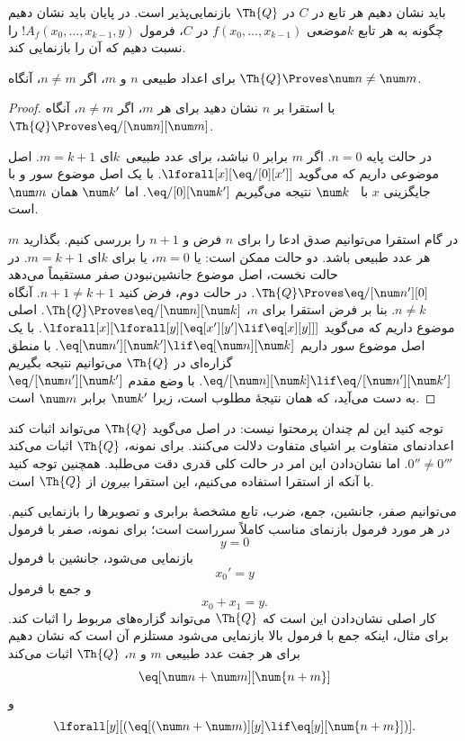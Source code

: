 \documentclass[../../../include/open-logic-section]{subfiles}
\begin{document}

باید نشان دهیم هر تابع در $C$ در $\Th{Q}$ بازنمایی‌پذیر است. در پایان
باید نشان دهیم چگونه به هر تابع $k$موضعی
$f(x_0,\dots,x_{k-1})$ در $C$، فرمول
$!A_f(x_0,\dots,x_{k-1},y)$ را نسبت دهیم که آن را بازنمایی کند.

\begin{lem}
برای اعداد طبیعی $n$ و $m$، اگر $n \neq m$، آنگاه
$\Th{Q} \Proves \num n \neq \num m$.
\end{lem}

\begin{proof}
با استقرا بر $n$ نشان دهید برای هر $m$، اگر $n \neq m$، آنگاه
$\Th{Q} \Proves \eq/[\num n][\num m]$.

در حالت پایه $n = 0$. اگر $m$ برابر $0$ نباشد، برای عدد طبیعی~$k$ای
$m = k + 1$. اصل موضوعی داریم که می‌گوید
$\lforall[x][\eq/[0][x']]$. با یک اصل موضوع سور و با جایگزینی $x$ با
~$\num k$ نتیجه می‌گیریم $\eq/[0][\num k']$. اما $\num k'$ همان
$\num m$ است.

در گام استقرا می‌توانیم صدق ادعا را برای $n$ فرض و $n+1$ را بررسی
کنیم. بگذارید $m$ هر عدد طبیعی باشد. دو حالت ممکن است: یا $m = 0$، یا
برای $k$ای $m = k+1$. در حالت نخست، اصل موضوع جانشین‌نبودن صفر مستقیماً
می‌دهد $\Th{Q} \Proves \eq/[\num n'][0]$. در حالت دوم، فرض کنید
$n+1 \neq k+1$. آنگاه $n \neq k$. بنا بر فرض استقرا برای $n$،
$\Th{Q} \Proves \eq/[\num n][\num k]$. اصلی موضوع داریم که می‌گوید
$\lforall[x][\lforall[y][\eq[x'][y'] \lif \eq[x][y]]]$. با یک اصل موضوع
سور داریم
$\eq[\num n'][\num k'] \lif \eq[\num n][\num k]$. با منطق گزاره‌ای در
$\Th{Q}$ می‌توانیم نتیجه بگیریم
$\eq/[\num n][\num k] \lif \eq/[\num n'][\num k']$. با وضع مقدم
$\eq/[\num n'][\num k']$ به دست می‌آید، که همان نتیجهٔ مطلوب است، زیرا
$\num k'$ برابر $\num m$ است.
\end{proof}

توجه کنید این لم چندان پرمحتوا نیست: در اصل می‌گوید $\Th{Q}$ می‌تواند
اثبات کند اعدادنمای متفاوت بر اشیای متفاوت دلالت می‌کنند. برای نمونه،
$\Th{Q}$ اثبات می‌کند $0'' \neq 0'''$. اما نشان‌دادن این امر در حالت
کلی قدری دقت می‌طلبد. همچنین توجه کنید با آنکه از استقرا استفاده
می‌کنیم، این استقرا \emph{بیرون} از $\Th{Q}$ است.

می‌توانیم صفر، جانشین، جمع، ضرب، تابع مشخصهٔ برابری و تصویرها را
بازنمایی کنیم. در هر مورد فرمول بازنمای مناسب کاملاً سرراست است؛ برای
نمونه، صفر با فرمول
\[
y = 0
\]
بازنمایی می‌شود، جانشین با فرمول
\[
x_0' = y
\]
و جمع با فرمول
\[
x_0 + x_1 = y.
\]
کار اصلی نشان‌دادن این است که $\Th{Q}$ می‌تواند گزاره‌های مربوط را
اثبات کند. برای مثال، اینکه جمع با فرمول بالا بازنمایی می‌شود مستلزم
آن است که نشان دهیم برای هر جفت عدد طبیعی $m$ و $n$، $\Th{Q}$ اثبات
می‌کند
\[
\eq[\num n + \num m][\num {n+m}]
\]
و
\[
\lforall[y][(\eq[(\num n + \num m)][y] \lif \eq[y][\num {n+m}])].
\]
\end{document}
